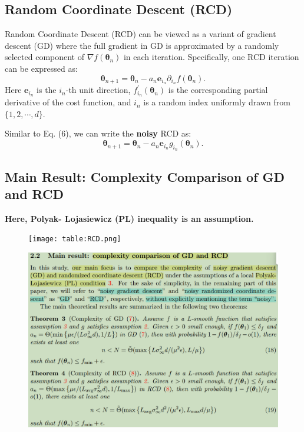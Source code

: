 \documentclass[
        11pt, %
	a4paper, %
]{LegrandOrangeBook}
\begin{document}
\subsection{Random Coordinate Descent (RCD)}

Random Coordinate Descent (RCD) can be viewed as a variant of gradient descent (GD) where the full gradient in GD is approximated by a randomly selected component of $\nabla f\left(\boldsymbol{\theta}_n\right)$ in each iteration. Specifically, one RCD iteration can be expressed as:
\begin{equation}
    \boldsymbol{\theta}_{n+1}=\boldsymbol{\theta}_n-a_n \boldsymbol{e}_{i_n} \partial_{i_n} f\left(\boldsymbol{\theta}_n\right) .
\end{equation}
Here $\boldsymbol{e}_{i_n}$ is the $i_n$-th unit direction, $f_{i_n}^{\prime}\left(\boldsymbol{\theta}_n\right)$ is the corresponding partial derivative of the cost function, and $i_n$ is a random index uniformly drawn from $\{1,2, \cdots, d\}$. 

Similar to Eq. (6), we can write the \textbf{noisy} RCD as:
\begin{equation}
    \boldsymbol{\theta}_{n+1}=\boldsymbol{\theta}_n-a_n \boldsymbol{e}_{i_n} g_{i_n}\left(\boldsymbol{\theta}_n\right).
\end{equation}

\subsection{Main Result: Complexity Comparison of GD and RCD}

\textbf{Here, Polyak- Lojasiewicz (PL) inequality is an assumption.}
\begin{figure}
    \centering
    \texttt{[image: table:RCD.png]}
\end{figure}
\begin{figure}
    \centering
    \includegraphics[width=1\linewidth]{main-results.png}
\end{figure}
\end{document}
